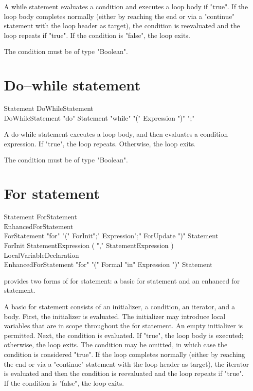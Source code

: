 A while statement evaluates a condition and executes a loop body
if \xcd"true".  If the loop body completes normally (either by reaching
the end or via a \xcd"continue" statement with the loop header
as target), the condition is reevaluated and the loop repeats if
\xcd"true".  If the condition is \xcd"false", the loop
exits.

The condition must be of type \xcd"Boolean".

\section{Do--while statement}

\begin{grammar}
Statement \: DoWhileStatement \\
DoWhileStatement \: \xcd"do" Statement \xcd"while" \xcd"(" Expression \xcd")" \xcd";" \\
\end{grammar}


A do-while statement executes a loop body, and then evaluates a
condition expression.  If \xcd"true", the loop repeats.
Otherwise, the loop exits.

The condition must be of type \xcd"Boolean".

\section{For statement}

\begin{grammar}
Statement \: ForStatement \\
          \| EnhancedForStatement \\
ForStatement \: \xcd"for" \xcd"("
        ForInit\opt \xcd";" Expression\opt \xcd";" ForUpdate\opt
        \xcd")" Statement \\
ForInit \:
        StatementExpression ( \xcd"," StatementExpression )\star
        \\
      \| LocalVariableDeclaration \\
EnhancedForStatement \: \xcd"for" \xcd"("
        Formal \xcd"in" Expression 
        \xcd")" Statement \\
\end{grammar}

\Xten{} provides two forms of for statement: a basic for
statement and an enhanced for statement.

A basic for statement consists of an initializer, a condition, an
iterator, and a body.  First, the initializer is evaluated.
The initializer may introduce local variables that are in scope
throughout the for statement.  An empty initializer is
permitted.
Next, the condition is evaluated.  If \xcd"true", the loop body
is executed; otherwise, the loop exits.
The condition may be omitted, in which case the condition is
considered \xcd"true".
If the loop completes normally (either by reaching the end
or via a \xcd"continue" statement with the loop header as
target),
the iterator is evaluated and then the condition is reevaluated
and the loop repeats if
\xcd"true".  If the condition is \xcd"false", the loop
exits.

